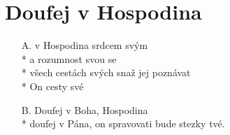 \section{Doufej v Hospodina}  %
\begin{enumerate}
\item[A.]  v Hospodina  srdcem svým \\*
a  rozumnost svou se  \\*
 všech cestách svých snaž  jej poznávat \\*
On   cesty své
\item[B.] Doufej v Boha, Hospodina \\*
doufej v Pána, on spravovati bude stezky tvé.
\end{enumerate}
